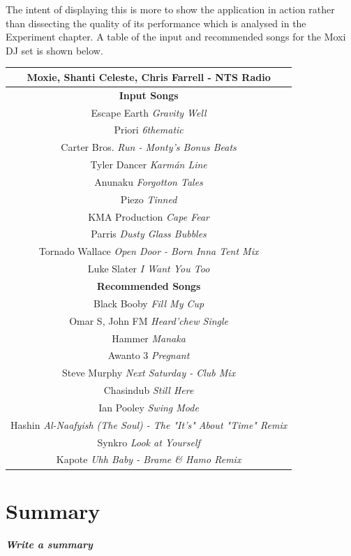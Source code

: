 The intent of displaying this is more to show the application in action rather than dissecting the quality of its performance which is analysed in the Experiment chapter. A table of the input and recommended songs for the Moxi DJ set is shown below.

\begin{center}
	\begin{tabular}{ |c|} 
		\hline
		\textbf{Moxie, Shanti Celeste, Chris Farrell - NTS Radio}\\ 
		\hline \textbf{Input Songs}\\ 
		\hline Escape Earth \textit{Gravity Well} \\ 
		\hline Priori \textit{6thematic }\\
		\hline Carter Bros. \textit{Run - Monty's Bonus Beats}\\
		\hline Tyler Dancer \textit{Karmán Line}\\ 
		\hline Anunaku \textit{Forgotton Tales}\\
		\hline Piezo \textit{Tinned}\\
		\hline KMA Production \textit{Cape Fear}\\
		\hline Parris \textit{Dusty Glass Bubbles}\\
		\hline Tornado Wallace \textit{Open Door - Born Inna Tent Mix}\\
		\hline Luke Slater \textit{I Want You Too}\\
		\hline \textbf{Recommended Songs}\\ 
		\hline Black Booby \textit{Fill My Cup}\\
		\hline Omar S, John FM \textit{Heard'chew Single}\\
		\hline Hammer \textit{Manaka}\\
		\hline Awanto 3 \textit{Pregnant}\\
		\hline Steve Murphy \textit{Next Saturday - Club Mix}\\
		\hline Chasindub \textit{Still Here}\\
		\hline Ian Pooley \textit{Swing Mode}\\
		\hline Hashin \textit{Al-Naafyish (The Soul) - The "It's" About "Time" Remix}\\
		\hline Synkro \textit{Look at Yourself}\\
		\hline Kapote \textit{Uhh Baby - Brame \& Hamo Remix}\\
		\hline
	\end{tabular}
\end{center}


\section{Summary}
\textbf{\textit{Write a summary}}


